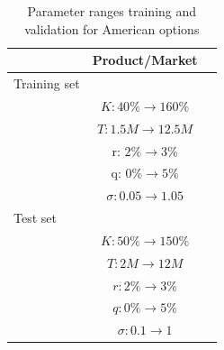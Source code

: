 \documentclass[12pt,a4paper,oneside]{book}
\begin{document}
\begin{table}\centering 
\begin{tabular}[t]{lcc}\toprule
            &   Product/Market   \\ \midrule
            Training set && \\\addlinespace
 & $K: 40 \% \rightarrow 160\%$  \\\addlinespace
			   & $T: 1.5M \rightarrow 12.5M$            \\\addlinespace
			   & r: $2\% \rightarrow 3\%  $           \\\addlinespace
			   & q: $0 \%  \rightarrow 5 \%$          \\\addlinespace
			   &  $\sigma: 0.05 \rightarrow 1.05$         \\\addlinespace
			    Test set && \\\addlinespace
 & $K: 50 \% \rightarrow 150\%$ \\\addlinespace
			   & $T: 2M \rightarrow 12M$         \\\addlinespace
			   & $r: 2\% \rightarrow 3\%  $      \\\addlinespace
			   & $q: 0 \%  \rightarrow 5 \%$       \\\addlinespace
			   &  $\sigma: 0.1 \rightarrow 1$        \\\bottomrule
\end{tabular}
\caption{Parameter ranges training and validation for American options }\label{table_American}
\end{table}
\end{document}
